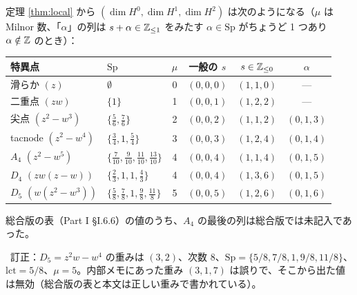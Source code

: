 \begin{obs}[代表的な型の茎の次元\ \tP]\label{obs:localtable}
定理 \ref{thm:local} から $(\dim H^0,\dim H^1,\dim H^2)$ は次のようになる（$\mu$ は Milnor 数、「$\alpha$」の列は $s+\alpha\in\mathbb Z_{\le1}$ をみたす $\alpha\in\mathrm{Sp}$ がちょうど 1 つあり $\alpha\notin\mathbb Z$ のとき）：
\begin{center}\small
\begin{tabular}{llcccc}\toprule
特異点 & $\mathrm{Sp}$ & $\mu$ & 一般の $s$ & $s\in\mathbb Z_{\le0}$ & $\alpha$\\\midrule
滑らか $(z)$ & $\emptyset$ & 0 & $(0,0,0)$ & $(1,1,0)$ & ---\\
二重点 $(zw)$ & $\{1\}$ & 1 & $(0,0,1)$ & $(1,2,2)$ & ---\\
尖点 $(z^2-w^3)$ & $\{\frac56,\frac76\}$ & 2 & $(0,0,2)$ & $(1,1,2)$ & $(0,1,3)$\\
tacnode $(z^2-w^4)$ & $\{\frac34,1,\frac54\}$ & 3 & $(0,0,3)$ & $(1,2,4)$ & $(0,1,4)$\\
$A_4$ $(z^2-w^5)$ & $\{\frac7{10},\frac9{10},\frac{11}{10},\frac{13}{10}\}$ & 4 & $(0,0,4)$ & $(1,1,4)$ & $(0,1,5)$\\
$D_4$ $(zw(z-w))$ & $\{\frac23,1,1,\frac43\}$ & 4 & $(0,0,4)$ & $(1,3,6)$ & $(0,1,5)$\\
$D_5$ $(w(z^2-w^3))$ & $\{\frac58,\frac78,1,\frac98,\frac{11}8\}$ & 5 & $(0,0,5)$ & $(1,2,6)$ & $(0,1,6)$\\\bottomrule
\end{tabular}
\end{center}
総合版の表（Part I §I.6.6）の値のうち、$A_4$ の最後の列は総合版では未記入であった。
\end{obs}
\noindent \tP\ 訂正：$D_5=z^2w-w^4$ の重みは $(3,2)$、次数 8、$\mathrm{Sp}=\{5/8,7/8,1,9/8,11/8\}$、$\mathrm{lct}=5/8$、$\mu=5$。内部メモにあった重み $(3,1,7)$ は誤りで、そこから出た値は無効（総合版の表と本文は正しい重みで書かれている）。

